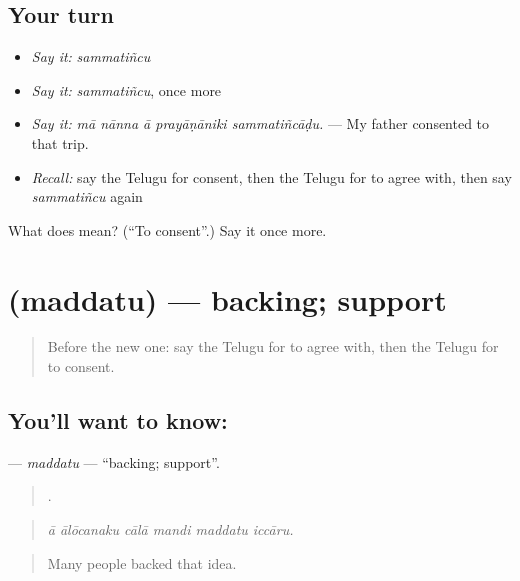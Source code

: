 \subsection*{Your turn}
\begin{itemize}
\raggedright
  \item \emph{Say it:} \emph{sammatiñcu}
  \item \emph{Say it:} \emph{sammatiñcu}, once more
  \item \emph{Say it:} \emph{mā nānna ā prayāṇāniki sammatiñcāḍu.} — My father consented to that trip.
  \item \emph{Recall:} say the Telugu for consent, then the Telugu for to agree with, then say \emph{sammatiñcu} again
\end{itemize}

\begin{tcolorbox}[breakable,colback=teal!4,colframe=teal!35!black,title={Before you move on}]
What does  mean? (\textquotedblleft{}To consent\textquotedblright{}.) Say it once more.
\end{tcolorbox}
\section[\texorpdfstring{\te{మద్దతు} (maddatu)}{మద్దతు (maddatu)}]{ (maddatu) — backing; support}

\label{lesson:TE-C385-maddatu}



\begin{quote}
Before the new one: say the Telugu for to agree with, then the Telugu for to consent.
\end{quote}

\subsection*{You'll want to know: }
\textbf{} — \emph{maddatu} — \textquotedblleft{}backing; support\textquotedblright{}.

\begin{quote}
     .
\end{quote}

\begin{quote}
\emph{ā ālōcanaku cālā mandi maddatu iccāru.}
\end{quote}

\begin{quote}
Many people backed that idea.
\end{quote}


